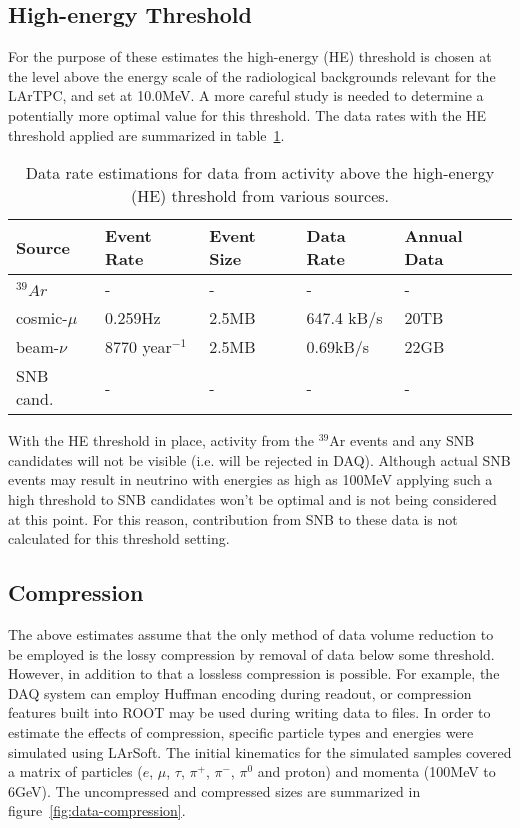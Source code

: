 \subsection{High-energy Threshold}

For the purpose of these estimates the  high-energy (HE) threshold is chosen at the level above 
the energy scale of the radiological backgrounds relevant for the LArTPC, and set at  10.0MeV.
A more careful study is needed to determine a potentially more optimal value for this threshold.
The data rates with the HE threshold applied are summarized in table~\ref{tab:he-volume}.

	
\begin{table}[ht!]
\centering
\begin{tabular}{| p{1.25in} | p{0.95in} | p{0.75in} | p{1in} | p{0.75in} |}		\hline	
Source & Event Rate & Event Size & Data Rate & Annual Data \\ \hline
$^{39}Ar$ & - & - & - & -\\	\hline
cosmic-$\mu$ & 0.259Hz & 2.5MB & 647.4 kB/s & 20TB \\ \hline
beam-$\nu$ & 8770 year$^{-1}$ & 2.5MB & 0.69kB/s & 22GB \\
\hline
SNB cand. & - & - & - & -\\ \hline
\end{tabular}
\caption{Data rate estimations for data from activity above the high-energy (HE) threshold from
various sources.}
\label{tab:he-volume}
\end{table}


%

With the HE threshold in place, activity from the $^{39}$Ar events and any SNB
candidates will not be visible (i.e. will be rejected in DAQ). Although actual SNB
events may result in neutrino with energies as high as 100MeV applying such a high
threshold to SNB candidates won't be optimal and is not being considered at this point.
For this reason, contribution from SNB to these data is not calculated for this threshold setting.


\subsection{Compression}

The above estimates assume that the only method of data volume reduction to be employed is the
lossy compression by removal of data below some threshold. However, in addition to that
a lossless compression is possible. For example, the DAQ system can employ Huffman encoding during readout, or compression features built into ROOT may be used during writing data to files. In order to estimate
the effects of compression, specific particle types and energies were simulated using LArSoft.
The initial kinematics for the simulated samples covered a matrix of
particles ($e$, $\mu$, $\tau$, $\pi^+$, $\pi^-$, $\pi^0$ and proton) and momenta
(100MeV to 6GeV).
The uncompressed and compressed sizes are summarized in figure~\ref{fig:data-compression}.


